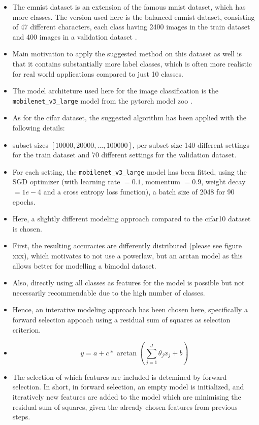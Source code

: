 \documentclass{article} %
\begin{document}
\begin{itemize}
    \item The emnist dataset is an extension of the famous mnist dataset, which has more classes. The version used here is the balanced emnist dataset, consisting of 47 different characters, each class having 2400 images in the train dataset and 400 images in a validation dataset \cite{cohen2017emnist}.  
    \item Main motivation to apply the suggested method on this dataset as well is that it contains substantially more label classes, which is often more realistic for real world applications compared to just 10 classes.
    \item The model architeture used here for the image classification is the \verb|mobilenet_v3_large| model from the pytorch model zoo \cite{howard2019mobilenetv3}.
    \item As for the cifar dataset, the suggested algorithm has been applied with the following details:
    \item subset sizes $[10000, 20000, \dots, 100000]$, per subset size 140 different settings for the train dataset and 70 different settings for the validation dataset.
    \item For each setting, the \verb|mobilenet_v3_large| model has been fitted, using the SGD optimizer (with learning rate $=0.1$, momentum $=0.9$, weight decay $=1e-4$ and a cross entropy loss function), a batch size of 2048 for 90 epochs. 
    \item Here, a slightly different modeling approach compared to the cifar10 dataset is chosen. 
    \item First, the resulting accuracies are differently distributed (please see figure xxx), which motivates to not use a powerlaw, but an arctan model as this allows better for modelling a bimodal dataset.
    \item Also, directly using all classes as features for the model is possible but not necessarily recommendable due to the high number of classes.
    \item Hence, an interative modeling approach has been chosen here, specifically a forward selection appoach using a residual sum of squares as selection criterion. 
    \item $$y = a + c* \arctan{\left(\sum_{j = 1}^{J}{\theta_j x_j} + b \right)}$$
    \item The selection of which features are included is detemined by forward selection. In short, in forward selection, an empty model is initialized, and iteratively new features are added to the model which are minimising the residual sum of squares, given the already chosen features from previous steps.

\end{itemize}
\end{document}

